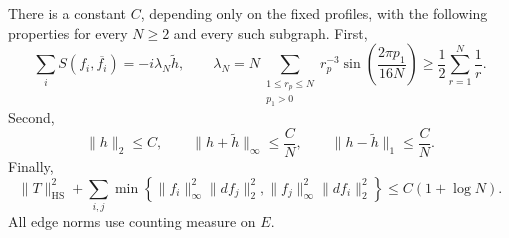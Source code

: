\begin{lemma}\label{lem:modes}
There is a constant $C$, depending only on the fixed profiles, with the
following properties for every $N\geq2$ and every such subgraph.
First,
\begin{equation}\label{eq:annulus-commutator}
 \sum_i S(f_i,\overline{f_i})=-i\lambda_N\widetilde h,
 \qquad
 \lambda_N
 =N\!\!\sum_{\substack{1\leq r_p\leq N\\p_1>0}}
      r_p^{-3}\sin\left(\frac{2\pi p_1}{16N}\right)
 \geq\frac12\sum_{r=1}^N\frac1r.
\end{equation}
Second,
\begin{equation}\label{eq:annulus-midpoint}
 \|h\|_2\leq C,\qquad
 \|h+\widetilde h\|_\infty\leq\frac CN,\qquad
 \|h-\widetilde h\|_1\leq\frac CN.
\end{equation}
Finally,
\begin{equation}\label{eq:annulus-test-cost}
 \|T\|_{\mathrm{HS}}^2+
 \sum_{i,j}\min\left\{
   \|f_i\|_\infty^2\|df_j\|_2^2,
   \|f_j\|_\infty^2\|df_i\|_2^2
 \right\}
 \leq C(1+\log N).
\end{equation}
All edge norms use counting measure on $E$.
\end{lemma}

